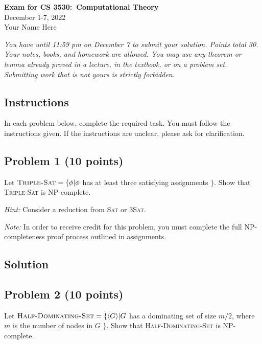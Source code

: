 \documentclass{article}
\begin{document}
\begin{empfile}

\begin{center}
\textbf{\Large Exam for CS 3530:~Computational Theory} \\[2mm]
December 1-7, 2022 \\[2mm]

Your Name Here

\textit{You have until 11:59 pm on December 7 to submit your solution. Points total 30.
Your notes, books, and homework are allowed. You may use any theorem or lemma
already proved in a lecture, in the textbook, or on a problem set.  Submitting
work that is not yours is strictly forbidden.}
\end{center}

\raggedright

\subsection*{Instructions}

In each problem below, complete the required task.  You must follow the
instructions given. If the instructions are unclear, please ask for clarification.

\subsection*{Problem 1 (10 points)}

Let $\textsc{Triple-Sat} = \{ \phi | \phi $ has at least three satisfying assignments $\}$. Show that
\textsc{Triple-Sat} is NP-complete.

\emph{Hint:} Consider a reduction from \textsc{Sat} or \textsc{3Sat}.

\emph{Note:} In order to receive credit for this problem, you must complete the full NP-completeness proof process outlined in assignments.

\subsection*{Solution}


\subsection*{Problem 2 (10 points)}

Let $\textsc{Half-Dominating-Set} = \{ \langle G \rangle | G $ has a dominating set of size $m/2$, where $m$ is the number of nodes in $G$ $\}$.
Show that \textsc{Half-Dominating-Set} is NP-complete.


\end{empfile}
\end{document}
